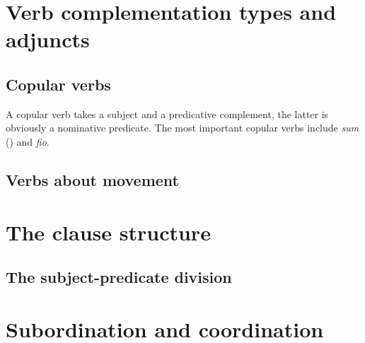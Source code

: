 \documentclass{article}
\newcommand*{\corpus}[1]{\emph{#1}}
\begin{document}
\section{Verb complementation types and adjuncts}\label{sec:verb-complement}

\subsection{Copular verbs}

A copular verb takes a subject and a predicative complement,
the latter is obviously a nominative predicate.
The most important copular verbs include \corpus{sum} () 
and \corpus{fio}.


\subsection{Verbs about movement}



\section{The clause structure}

\subsection{The subject-predicate division}\label{sec:subject-predicate}

\section{Subordination and coordination}




\end{document}
